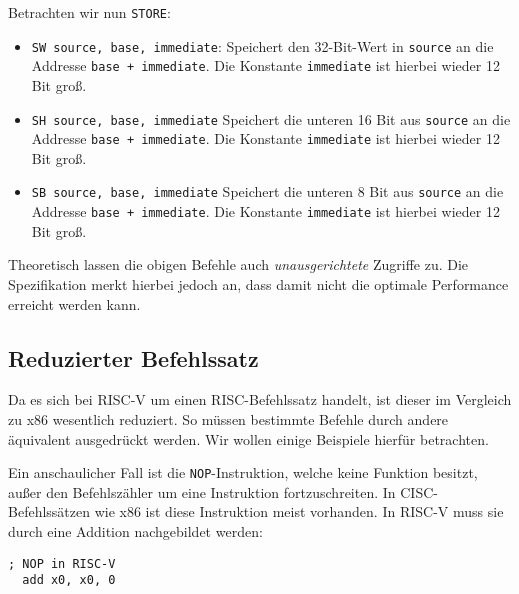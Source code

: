 Betrachten wir nun \lstinline[style=risc-v_Assembler]!STORE!:

\begin{itemize}
  \item \lstinline[style=risc-v_Assembler]!SW source, base, immediate!: Speichert den 32-Bit-Wert in \lstinline[style=risc-v_Assembler]!source!
    an die Addresse \lstinline[style=risc-v_Assembler]!base + immediate!. Die Konstante \lstinline[style=risc-v_Assembler]!immediate! ist
    hierbei wieder 12 Bit groß.
  \item \lstinline[style=risc-v_Assembler]!SH source, base, immediate! Speichert die unteren 16 Bit aus \lstinline[style=risc-v_Assembler]!source! an die Addresse
    \lstinline[style=risc-v_Assembler]!base + immediate!. Die Konstante \lstinline[style=risc-v_Assembler]!immediate! ist hierbei wieder
    12 Bit groß.
  \item \lstinline[style=risc-v_Assembler]!SB source, base, immediate! Speichert die unteren 8 Bit aus \lstinline[style=risc-v_Assembler]!source! an die Addresse
    \lstinline[style=risc-v_Assembler]!base + immediate!. Die Konstante \lstinline[style=risc-v_Assembler]!immediate! ist hierbei wieder
    12 Bit groß.
\end{itemize}

Theoretisch lassen die obigen Befehle auch \emph{unausgerichtete}
Zugriffe zu. Die Spezifikation merkt hierbei jedoch an,
dass damit nicht die optimale Performance erreicht werden kann.

\subsection{Reduzierter Befehlssatz}

Da es sich bei RISC-V um einen RISC-Befehlssatz handelt, ist dieser im Vergleich
zu x86 wesentlich reduziert. So müssen bestimmte Befehle durch andere äquivalent
ausgedrückt werden. Wir wollen einige Beispiele hierfür betrachten.

Ein anschaulicher Fall ist die \lstinline[style=x86Assembler]!NOP!-Instruktion, welche keine Funktion
besitzt, außer den Befehlszähler um eine Instruktion fortzuschreiten. In CISC-Befehlssätzen
wie x86 ist diese Instruktion meist vorhanden. In RISC-V muss sie
durch eine Addition nachgebildet werden:

\begin{lstlisting}[style=risc-v_Assembler]
  ; NOP in RISC-V
  add x0, x0, 0
\end{lstlisting}

